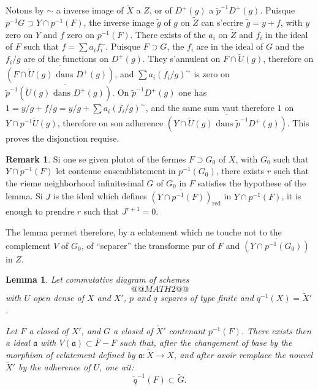 \documentclass[11pt,a4paper]{article}
\theoremstyle{plain}
\newtheorem{lemma}[theorem]{Lemma}
\theoremstyle{definition}
\newtheorem{remark}[theorem]{Remark}
\begin{document}
Notons by $\sim$ a inverse image of $\widetilde{X}$ a $Z$, or of $D^+(g)$ a $\tilde{p}^{-1}D^+(g)$. Puisque $p^{-1}G \supset Y \cap p^{-1}(F)$, the inverse image $\tilde{g}$ of $g$ on $\widetilde{Z}$ can s'ecrire $\tilde{g} = y + f$, with $y$ zero on $Y$ and $f$ zero on $p^{-1}(F)$. There exists of the $a_i$ on $\widetilde{Z}$ and $f_i$ in the ideal of $F$ such that $f = \sum a_i f_i^{\sim}$. Puisque $F \supset G$, the $f_i$ are in the ideal of $G$ and the $f_i/g$ are of the functions on $D^+(g)$. They s'annulent on $F \cap \widetilde{U}(g)$, therefore on $\overline{(F \cap \widetilde{U}(g) \text{ dans } D^+(g))}$, and $\sum a_i (f_i/g)^{\sim}$ is zero on $\tilde{p}^{-1}\overline{(\widetilde{U}(g) \text{ dans } D^+(g))}$. On $\tilde{p}^{-1}D^+(g)$ one has $1 = y/g + f/g = y/g + \sum a_i (f_i/g)^{\sim}$, and the same sum vaut therefore $1$ on $Y \cap p^{-1}\widetilde{U}(g)$, therefore on son adherence $\overline{(Y \cap \widetilde{U}(g) \text{ dans } \tilde{p}^{-1}D^+(g))}$. This proves the disjonction requise.

\begin{remark}
Si one se given plutot of the fermes $F \supset G_0$ of $X$, with $G_0$ such that $Y \cap p^{-1}(F)$ let contenue ensemblistement in $p^{-1}(G_0)$, there exists $r$ such that the $r$ieme neighborhood infinitesimal $G$ of $G_0$ in $F$ satisfies the hypothese of the lemma. Si $J$ is the ideal which defines $\overline{(Y \cap p^{-1}(F))}_{\text{red}}$ in $Y \cap p^{-1}(F)$, it is enough to prendre $r$ such that $J^{r+1} = 0$.

The lemma permet therefore, by a eclatement which ne touche not to the complement $V$ of $G_0$, of ``separer'' the transforme pur of $F$ and $\overline{(Y \cap p^{-1}(G_0))}$ in $Z$.
\end{remark}

\begin{lemma}
Let commutative diagram of schemes
\[
@@MATH2@@
\]
with $U$ open dense of $X$ and $X'$, $p$ and $q$ separes of type finite and $q^{-1}(X) = \widetilde{X}'$.

Let $F$ a closed of $X'$, and $G$ a closed of $\widetilde{X}'$ contenant $p^{-1}(F)$. There exists then a ideal $\mathfrak{a}$ with $V(\mathfrak{a}) \subset \overline{F} - F$ such that, after the changement of base by the morphism of eclatement defined by $\mathfrak{a}: \widetilde{X} \to X$, and after avoir remplace the nouvel $\widetilde{X}'$ by the adherence of $U$, one ait:
\[
\widetilde{q}^{-1}(F) \subset \widetilde{G}.
\]
\end{lemma}
\end{document}
